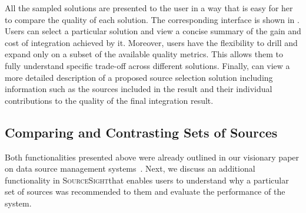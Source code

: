 \documentclass{vldb}
\newcommand\system{\textsc{SourceSight}}
\begin{document}
All the sampled solutions are presented to the user in a way that is easy for her to compare the quality of each solution. The corresponding interface is shown in . Users can select a particular solution and view a concise summary of the gain and cost of integration achieved by it. Moreover,  users have the flexibility to drill and expand only on a subset of the available quality metrics. This allows them to fully understand specific trade-off across different solutions. Finally, can view a more detailed description of a proposed source selection solution including information such as the sources included in the result and their individual contributions to the quality of the final integration result. 

\subsection{Comparing and Contrasting Sets of Sources}
\label{sec:extensions}
Both functionalities presented above were already outlined in our visionary paper on data source management systems~\cite{rekatsinas:2015}. Next, we discuss an additional functionality in \system that enables users to understand why a particular set of sources was recommended to them and evaluate the performance of the system.
\end{document}
